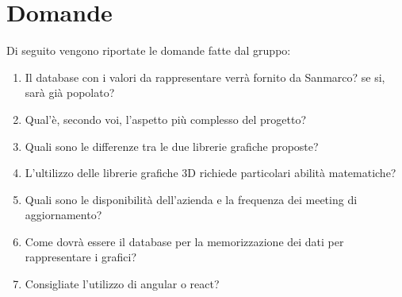 \documentclass[a4paper, 12pt]{article}
\begin{document}
\section{Domande}
Di seguito vengono riportate le domande fatte dal gruppo:
\begin{enumerate}
    \item  Il database con i valori da rappresentare verrà fornito da Sanmarco? se si, sarà già popolato?
    \item Qual’è, secondo voi, l’aspetto più complesso del progetto?
    \item Quali sono le differenze tra le due librerie grafiche proposte?
    \item L’ultilizzo delle librerie grafiche 3D richiede particolari abilità matematiche?
    \item Quali sono le disponibilità dell’azienda e la frequenza dei meeting di aggiornamento?
    \item  Come dovrà essere il database per la memorizzazione dei dati per rappresentare i grafici?
    \item  Consigliate l’utilizzo di angular o react?
\end{enumerate}
\end{document}
